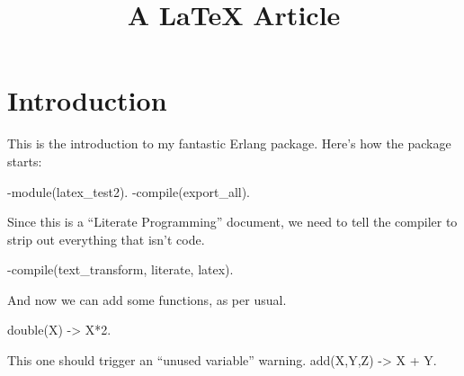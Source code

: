 \documentclass[]{article}
\title{A LaTeX Article}
\author{  }
\date{}
\newenvironment{code}{\footnotesize\verbatim}{\endverbatim\normalsize}
\begin{document}
\ifpdf
{}
\else
{}
\fi

\maketitle


\begin{abstract}
\end{abstract}

\section{Introduction}

This is the introduction to my fantastic Erlang package.  Here's how the package starts:

\begin{code}
	-module(latex_test2).
	-compile(export_all).
\end{code}

Since this is a ``Literate Programming'' document, we need to tell the compiler
to strip out everything that isn't code.

\begin{code}
	-compile({text_transform, literate, latex}).
\end{code}

And now we can add some functions, as per usual.

\begin{code}
	double(X) -> X*2.
\end{code}

This one should trigger an ``unused variable'' warning.
\begin{code}
	add(X,Y,Z) -> X + Y.
\end{code}








\end{document}
